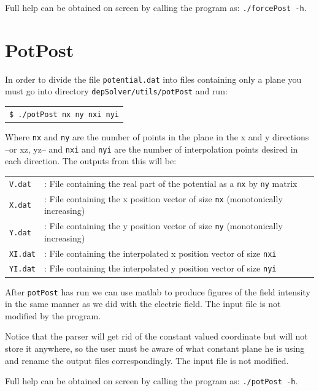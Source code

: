 \documentclass[12pt]{report}
\begin{document}
Full help can be obtained on screen by calling the program as: \texttt{./forcePost -h}.

\section{PotPost} 
In order to divide the file \verb+potential.dat+ into files containing only a plane you must go into directory \verb+depSolver/utils/potPost+ and run:

\begin{tabular}{l}
\texttt{\$ ./potPost nx ny nxi nyi}
\end{tabular}

Where \verb+nx+ and \verb+ny+ are the number of points in the plane in the x and y directions --or xz, yz-- and \verb+nxi+ and \verb+nyi+ are the number of interpolation points desired in each direction. The outputs from this will be:

\begin{tabular}{ll}
\texttt{V.dat} &: File containing the real part of the potential as a \verb+nx+ by \verb+ny+ matrix\\
\texttt{X.dat} &: File containing the x position vector of size \verb+nx+ (monotonically increasing)\\
\texttt{Y.dat} &: File containing the y position vector of size \verb+ny+ (monotonically increasing)\\
\texttt{XI.dat} &: File containing the interpolated x position vector of size \verb+nxi+\\
\texttt{YI.dat} &: File containing the interpolated y position vector of size \verb+nyi+
\end{tabular}

After \verb+potPost+ has run we can use matlab to produce figures of the field intensity in the same manner as we did with the electric field. The input file is not modified by the program.

Notice that the parser will get rid of the constant valued coordinate but will not store it anywhere, so the user must be aware of what constant plane he is using and rename the output files correspondingly. The input file is not modified.

Full help can be obtained on screen by calling the program as: \texttt{./potPost -h}.

\pagebreak
\section*{}
\pagebreak
\end{document}
